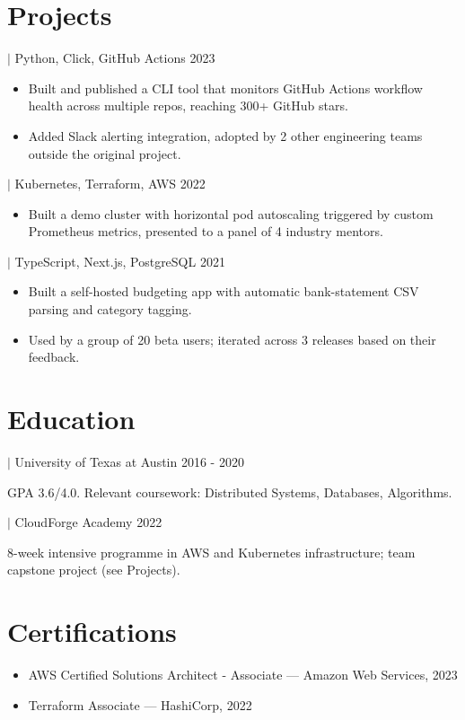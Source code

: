 \documentclass[11pt]{article}
\newcommand{\job}[4]{%
  \vspace{4pt}{\bfseries #1} $\vert$ #2#3 \hfill #4\par}
\begin{document}
\section{Projects}

\job{shipwatch (open-source CLI)}{Python, Click, GitHub Actions}{}{2023}
\begin{itemize}
  \item Built and published a CLI tool that monitors GitHub Actions workflow
        health across multiple repos, reaching 300+ GitHub stars.
  \item Added Slack alerting integration, adopted by 2 other engineering teams
        outside the original project.
\end{itemize}

\job{Kubernetes autoscaling demo (bootcamp capstone)}{Kubernetes, Terraform, AWS}{}{2022}
\begin{itemize}
  \item Built a demo cluster with horizontal pod autoscaling triggered by
        custom Prometheus metrics, presented to a panel of 4 industry mentors.
\end{itemize}

\job{Personal finance tracker}{TypeScript, Next.js, PostgreSQL}{}{2021}
\begin{itemize}
  \item Built a self-hosted budgeting app with automatic bank-statement CSV
        parsing and category tagging.
  \item Used by a group of 20 beta users; iterated across 3 releases based on
        their feedback.
\end{itemize}

\section{Education}
\job{B.S. Computer Science}{University of Texas at Austin}{}{2016 - 2020}
GPA 3.6/4.0. Relevant coursework: Distributed Systems, Databases, Algorithms.

\job{Cloud Infrastructure Bootcamp}{CloudForge Academy}{}{2022}
8-week intensive programme in AWS and Kubernetes infrastructure; team
capstone project (see Projects).

\section{Certifications}
\begin{itemize}
  \item AWS Certified Solutions Architect - Associate — Amazon Web Services, 2023
  \item Terraform Associate — HashiCorp, 2022
\end{itemize}
\end{document}
